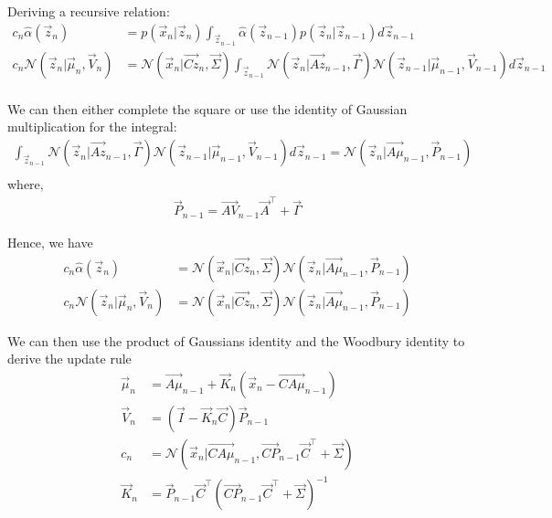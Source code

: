 \documentclass[12pt,twoside]{article}
\begin{document}
Deriving a recursive relation:
\begin{align*}
	c_n \hat{\alpha}(\vec{z}_n)	
	&= p(\vec{x}_n \vert \vec{z}_n)\int_{\vec{z}_{n-1}} \hat{\alpha}(\vec{z}_{n-1}) p(\vec{z}_n \vert \vec{z}_{n-1})d\vec{z}_{n-1}\\
	c_n \mathcal{N} (\vec{z}_n \vert \vec{\mu}_n, \vec{V}_n) 
	& = \mathcal{N}(\vec{x}_n \vert \vec{Cz}_n, \vec{\Sigma})\int_{\vec{z}_{n-1}} \mathcal{N}(\vec{z}_n\vert \vec{Az}_{n-1}, \vec{\Gamma})\mathcal{N}(\vec{z}_{n-1}\vert \vec{\mu}_{n-1}, \vec{V}_{n-1})d\vec{z}_{n-1}\\
\end{align*}

We can then either complete the square or use the identity of Gaussian multiplication for the integral:
\begin{align*}
	\int_{\vec{z}_{n-1}} \mathcal{N} (\vec{z}_n \vert \vec{Az}_{n-1}, \vec{\Gamma})\mathcal{N}(\vec{z}_{n-1}\vert \vec{\mu}_{n-1}, \vec{V}_{n-1}) d\vec{z}_{n-1}
	 = \mathcal{N} (\vec{z}_n \vert \vec{A\mu}_{n-1}, \vec{P}_{n-1})\\
\end{align*}
where,
\begin{align*}
	 \vec{P}_{n-1} = \vec{AV}_{n-1}\vec{A}^\top +\vec{\Gamma}
\end{align*}

Hence, we have 
\begin{align*}
	c_n \hat{\alpha}(\vec{z}_n)	& = \mathcal{N}(\vec{x}_n \vert \vec{Cz}_n, \vec{\Sigma})\mathcal{N} (\vec{z}_n \vert \vec{A\mu}_{n-1}, \vec{P}_{n-1})\\
	c_n\mathcal{N} (\vec{z}_n\vert \vec{\mu}_n, \vec{V}_n)& = \mathcal{N}(\vec{x}_n \vert \vec{Cz}_n, \vec{\Sigma})\mathcal{N} (\vec{z}_n \vert \vec{A\mu}_{n-1}, \vec{P}_{n-1})
\end{align*}

We can then use the product of Gaussians identity and the Woodbury identity to derive the update rule
\begin{align*}
	\vec{\mu}_n		& = \vec{A\mu}_{n-1} + \vec{K}_n(\vec{x}_n- \vec{CA\mu}_{n-1})\\
	\vec{V}_n			& = (\vec{I} - \vec{K}_n\vec{C})\vec{P}_{n-1}\\
	c_n					& = \mathcal{N}(\vec{x}_n \vert \vec{CA\mu}_{n-1}, \vec{CP}_{n-1} \vec{C}^\top +\vec{\Sigma})\\
	\vec{K}_n			& = \vec{P}_{n-1}\vec{C}^\top (\vec{CP}_{n-1}\vec{C}^\top + \vec{\Sigma})^{-1}
\end{align*}
\end{document}
